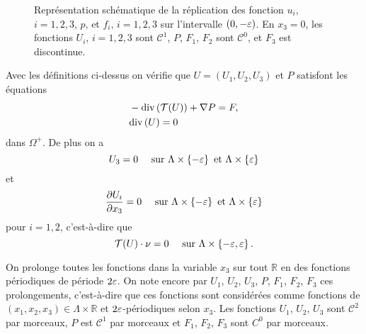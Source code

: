 \begin{figure}
  \begin{center}
    
    \caption{Représentation schématique de la réplication des fonction
    $u_i$, $i = 1,2,3$, $p$, et $f_i$, $i = 1,2,3$ sur l'intervalle
      $(0, -\varepsilon)$. En $x_3 = 0$, les fonctions $U_i$,
      $i=1,2,3$ sont $\mathcal C^1$, $P$, $F_1$, $F_2$ sont $\mathcal
      C^0$, et $F_3$ est discontinue.}
    \label{fig:solution-periodique}
  \end{center}
\end{figure}


Avec les définitions ci-dessus on vérifie que $U = (U_1, U_2, U_3)$ et
$P$ satisfont les équations
\begin{align}
  &-\mathrm{div}\left( \mathcal T(U) \right) + \nabla P = F,\label{eq:stokes-periodic-1}\\
  &\mathrm{div}\left( U \right) = 0\label{eq:stokes-periodic-2}
\end{align}
dans $\Omega^+$. De plus on a
\begin{equation}
U_3 = 0 \quad\text{ sur } \Lambda\times \left\{ -\varepsilon \right\} \text{ et } \Lambda\times \left\{ \varepsilon \right\}
\end{equation}
et
\begin{equation}
  \frac{\partial U_i}{\partial x_3} = 0\quad \text{ sur } \Lambda\times
  \left\{ -\varepsilon \right\} \text{ et } \Lambda\times \left\{ \varepsilon \right\}
\end{equation}
pour $i = 1,2$, c'est-à-dire que
\begin{equation}
\mathcal T(U)\cdot \nu = 0\quad \text{ sur } \Lambda\times
\left\{ -\varepsilon, \varepsilon \right\}.
\end{equation}

On prolonge toutes les fonctions dans la variable $x_3$ sur tout
$\mathbb R$ en des fonctions périodiques de période $2\varepsilon$. On
note encore par $U_1$, $U_2$, $U_3$, $P$, $F_1$, $F_2$, $F_3$ ces
prolongements, c'est-à-dire que ces fonctions sont considérées comme
fonctions de $(x_1, x_2, x_3)\in \Lambda\times \mathbb R$ et
$2\varepsilon$-périodiques selon $x_3$. Les fonctions $U_1$, $U_2$,
$U_3$ sont $\mathcal C^2$ par morceaux, $P$ est $\mathcal C^1$ par
morceaux et $F_1$, $F_2$, $F_3$ sont $C^0$ par morceaux.

